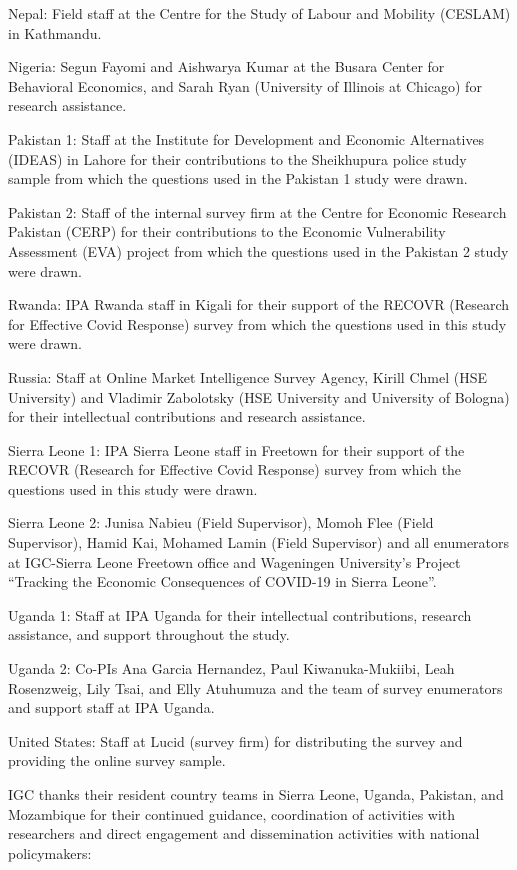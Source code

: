 \documentclass[
  12pt,
]{article}
\begin{document}
Nepal: Field staff at the Centre for the Study of Labour and Mobility (CESLAM) in Kathmandu.

Nigeria: Segun Fayomi and Aishwarya Kumar at the Busara Center for Behavioral Economics, and Sarah Ryan (University of Illinois at Chicago) for research assistance.

Pakistan 1: Staff at the Institute for Development and Economic Alternatives (IDEAS) in Lahore for their contributions to the Sheikhupura police study sample from which the questions used in the Pakistan 1 study were drawn.

Pakistan 2: Staff of the internal survey firm at the Centre for Economic Research Pakistan (CERP) for their contributions to the Economic Vulnerability Assessment (EVA) project from which the questions used in the Pakistan 2 study were drawn.

Rwanda: IPA Rwanda staff in Kigali for their support of the RECOVR (Research for Effective Covid Response) survey from which the questions used in this study were drawn.

Russia: Staff at Online Market Intelligence Survey Agency, Kirill Chmel (HSE University) and Vladimir Zabolotsky (HSE University and University of Bologna) for their intellectual contributions and research assistance.

Sierra Leone 1: IPA Sierra Leone staff in Freetown for their support of the RECOVR (Research for Effective Covid Response) survey from which the questions used in this study were drawn.

Sierra Leone 2: Junisa Nabieu (Field Supervisor), Momoh Flee (Field Supervisor), Hamid Kai, Mohamed Lamin (Field Supervisor) and all enumerators at IGC-Sierra Leone Freetown office and Wageningen University's Project ``Tracking the Economic Consequences of COVID-19 in Sierra Leone''.

Uganda 1: Staff at IPA Uganda for their intellectual contributions, research assistance, and support throughout the study.

Uganda 2: Co-PIs Ana Garcia Hernandez, Paul Kiwanuka-Mukiibi, Leah Rosenzweig, Lily Tsai, and Elly Atuhumuza and the team of survey enumerators and support staff at IPA Uganda.

United States: Staff at Lucid (survey firm) for distributing the survey and providing the online survey sample.

IGC thanks their resident country teams in Sierra Leone, Uganda, Pakistan, and Mozambique for their continued guidance, coordination of activities with researchers and direct engagement and dissemination activities with national policymakers:
\end{document}
